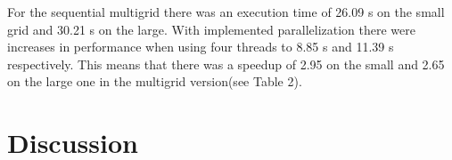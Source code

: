 \documentclass{article}
\begin{document}
For the sequential multigrid there was an execution time of 26.09 s on the small grid and 30.21 s on the large. With implemented parallelization there were increases in performance when using four threads to 8.85 s and 11.39 s respectively. This means that there was a speedup of 2.95 on the small and 2.65 on the large one in the multigrid version(see Table 2).

\begin{table}
\centering
{}
\caption{Multigrid test results}
\label{fig:multigrid}
\end{table}



\section{Discussion}\label{discussion}
\end{document}
